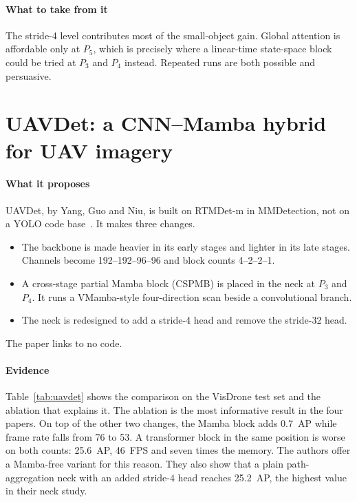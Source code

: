 \paragraph{What to take from it}
The stride-4 level contributes most of the small-object gain. Global
attention is affordable only at $P_5$, which is precisely where a linear-time
state-space block could be tried at $P_3$ and $P_4$ instead. Repeated runs
are both possible and persuasive.

\section{UAVDet: a CNN--Mamba hybrid for UAV imagery}
\label{sec:src-uavdet}

\paragraph{What it proposes}
UAVDet, by Yang, Guo and Niu, is built on RTMDet-m in MMDetection, not on a
YOLO code base~\citep{yang2026uavdet,lyu2022rtmdet}. It makes three changes.
\begin{itemize}
  \item The backbone is made heavier in its early stages and lighter in its
        late stages. Channels become 192--192--96--96 and block counts
        4--2--2--1.
  \item A cross-stage partial Mamba block (CSPMB) is placed in the neck at
        $P_3$ and $P_4$. It runs a VMamba-style four-direction scan beside a
        convolutional branch.
  \item The neck is redesigned to add a stride-4 head and remove the
        stride-32 head.
\end{itemize}
The paper links to no code.

\paragraph{Evidence}
Table~\ref{tab:uavdet} shows the comparison on the VisDrone test set and the
ablation that explains it. The ablation is the most informative result in
the four papers. On top of the other two changes, the Mamba block adds
0.7~AP while frame rate falls from 76 to 53. A transformer block in the same
position is worse on both counts: 25.6~AP, 46~FPS and seven times the memory.
The authors offer a Mamba-free variant for this reason. They also show that
a plain path-aggregation neck with an added stride-4 head reaches 25.2~AP,
the highest value in their neck study.

